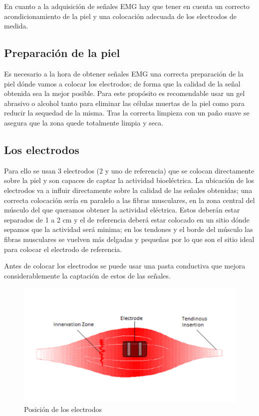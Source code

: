 En cuanto a la adquisición de señales EMG hay que tener en cuenta un correcto acondicionamiento de la piel y una colocación adecuada de los electrodos de medida.

\subsection{Preparación de la piel} \label{sec:Preparaciondelapiel}
 Es necesario a la hora de obtener señales EMG una correcta preparación de la piel dónde vamos a colocar los electrodos; de forma que la calidad de la señal obtenida sea la mejor posible. Para este propósito es recomendable usar un gel abrasivo o alcohol tanto para eliminar las células muertas de la piel como para reducir la sequedad de la misma. Tras la correcta limpieza con un paño suave se asegura que la zona quede totalmente limpia y seca. \newline
\subsection{Los electrodos} \label{sec:Loselectrodos}
Para ello se usan 3 electrodos  (2 y uno de referencia) que se colocan directamente sobre la piel y son capaces de captar la actividad bioeléctrica. La ubicación de los electrodos va a influir directamente sobre la calidad de las señales obtenidas; una correcta colocación sería en paralelo a las fibras musculares, en la zona central del músculo del que queramos obtener la actividad eléctrica. Estos deberán estar separados de 1 a 2 cm y el de referencia deberá estar colocado en un sitio dónde sepamos que la actividad será minima; en los tendones y el borde del músculo las fibras musculares se vuelven más delgadas y pequeñas por lo que son el sitio ideal para colocar el electrodo de referencia. 

Antes de colocar los electrodos se puede usar una pasta conductiva que mejora considerablemente la captación de estos de las señales.\newline

\begin{figure}[H]
	\center
	\includegraphics[scale=0.8]{imagenes/Disenodelsistema/electrodo.png}
	\caption{Posición de los electrodos}
	\label{fig:Posicion}
\end{figure}

